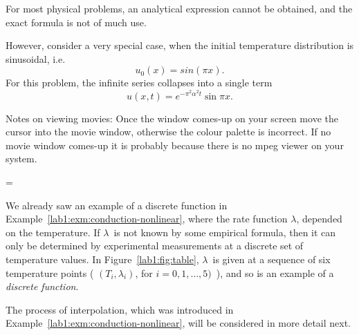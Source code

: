 \documentclass{article}
\makeatletter
\let\realnormalsize=\normalsize
\def\preveqno{}\let\real@float=\@float \let\realend@float=\end@float
\def\@float{\let\@savefreelist\@freelist\real@float}
\def\liih@math{\ifmmode$\else\bad@math\fi}
\def\end@float{\realend@float\global\let\@freelist\@savefreelist}
\def\adjustnormalsize{\def\normalsize{\mathsurround=0pt \realnormalsize
 \parindent=0pt\abovedisplayskip=0pt\belowdisplayskip=0pt}%
 \def\phantompar{\csname par\endcsname}\normalsize}%
\def\lthtmltypeout#1{{\let\protect\string \immediate\write\lthtmlwrite{#1}}}%
\newcommand\lthtmlvboxmathA{\adjustnormalsize\setbox\sizebox=\vbox\bgroup %
 \let\ifinner=\iffalse \let\)\liih@math }%
\newcommand\lthtmlboxmathZ{\@next\next\@currlist{}{\def\next{\voidb@x}}%
 \expandafter\box\next\egroup}%
\newcommand\lthtmlmathtype[1]{\gdef\lthtmlmathenv{#1}}%
\newcommand\lthtmllogmath{\lthtmltypeout{l2hSize %
:\lthtmlmathenv:\the\ht\sizebox::\the\dp\sizebox::\the\wd\sizebox.\preveqno}}%
\newcommand\lthtmlfigureA[1]{\let\@savefreelist\@freelist
       \lthtmlmathtype{#1}\lthtmlvboxmathA}%
\newcommand\lthtmlfigureZ{\lthtmlboxmathZ\lthtmllogmath\copy\sizebox
       \global\let\@freelist\@savefreelist}%
\def\lthtmlcheckvsize{\ifdim\ht\sizebox<\vsize 
  \ifdim\wd\sizebox<\hsize\expandafter\hfill\fi \expandafter\vfill
  \else\expandafter\vss\fi}%
\makeatother
\begin{document}
{\begin{example}
\begin{enumerate}
  \end{enumerate}
  For most physical problems, an analytical expression cannot be
  obtained, and the exact formula is not of much use.  
\par However, consider a very special case, when 
the initial temperature distribution is sinusoidal, i.e.~
  \begin{displaymath}
    u_0(x) = sin(\pi x).
  \end{displaymath}
  For this problem, the infinite series collapses into a single term
  \begin{displaymath}
    u(x,t) = e^{-\pi^2\alpha^2t}\sin{\pi x}.
  \end{displaymath}
\par{}
\par Notes on viewing movies:  Once the window comes-up on your screen
move the cursor into the movie window, otherwise the colour palette
is incorrect.  If no movie window comes-up it is probably because
there is no mpeg viewer on your system.
\par\end{example}%
\lthtmlfigureZ
\lthtmlcheckvsize\clearpage}

{\newpage\clearpage
\lthtmlfigureA{example525}%
\begin{example}

  We already saw an example of a discrete function in
  Example~\ref{lab1:exm:conduction-nonlinear}, where the rate function
  $\lambda$, depended on the temperature.
  If $\lambda$\  is not known by
  some empirical formula, then it can only be determined by
  experimental  
  measurements at a discrete set of temperature values. 
  In Figure~\ref{lab1:fig:table}, $\lambda$\  is given at a sequence of six
  temperature 
  points ( $(T_i, \lambda_i)$, for $i = 0, 1, \dots, 5)$\  ), and so is
  an example of a \emph{discrete function}.
\par The process of interpolation, which was introduced in
  Example~\ref{lab1:exm:conduction-nonlinear}, will be considered in more
  detail next.
\end{example}%
\lthtmlfigureZ
\lthtmlcheckvsize\clearpage}
\end{document}
